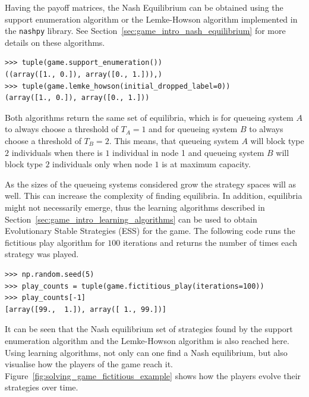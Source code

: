 Having the payoff matrices, the Nash Equilibrium can be obtained using the
support enumeration algorithm or the Lemke-Howson algorithm implemented in the
\lstinline[style=pystyle]{nashpy} library.
See Section~\ref{sec:game_intro_nash_equilibrium} for more details on these
algorithms.

\begin{lstlisting}[style=pystyle]
>>> tuple(game.support_enumeration())
((array([1., 0.]), array([0., 1.])),)
>>> tuple(game.lemke_howson(initial_dropped_label=0))
(array([1., 0.]), array([0., 1.]))

\end{lstlisting}

Both algorithms return the same set of equilibria, which is for queueing system
\(A\) to always choose a threshold of \(T_A = 1\) and for queueing system
\(B\) to always choose a threshold of \(T_B = 2\).
This means, that queueing system \(A\) will block type \(2\) individuals when
there is \(1\) individual in node 1 and queueing system \(B\) will block type
\(2\) individuals only when node \(1\) is at maximum capacity.

As the sizes of the queueing systems considered grow the strategy spaces will as well. This can increase the complexity of finding equilibria.
In addition, equilibria might not necessarily emerge, thus the learning algorithms described in
Section~\ref{sec:game_intro_learning_algorithms} can be used to obtain
Evolutionary Stable Strategies (ESS) for the game.
The following code runs the fictitious play algorithm for \(100\) iterations
and returns the number of times each strategy was played.

\begin{lstlisting}[style=pystyle]
>>> np.random.seed(5)
>>> play_counts = tuple(game.fictitious_play(iterations=100))
>>> play_counts[-1]
[array([99.,  1.]), array([ 1., 99.])]

\end{lstlisting}

It can be seen that the Nash equilibrium set of strategies found by the
support enumeration algorithm and the Lemke-Howson algorithm is also reached
here.
Using learning algorithms, not only can one find a Nash equilibrium,
but also visualise how the players of the game reach it.
Figure~\ref{fig:solving_game_fictitious_example} shows how the players evolve
their strategies over time.

